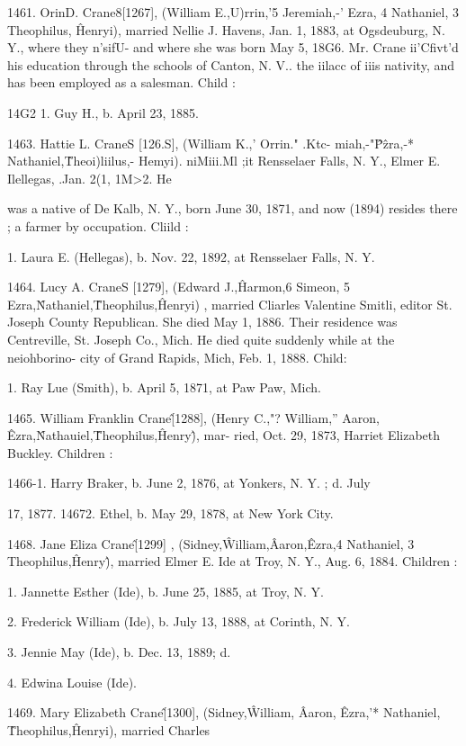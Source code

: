 \documentclass{book}
\begin{document}
1461. OrinD. Crane8[1267], (William E.,U)rrin,'5 Jeremiah,-' 
Ezra, 4 Nathaniel, 3 Theophilus, \^ Henryi), married Nellie J. 
Havens, Jan. 1, 1883, at Ogsdeuburg, N. Y., where they n'sifU- 
and where she was born May 5, 18G6. Mr. Crane ii'Cfivt'd his 
education through the schools of Canton, N. V.. the iilacc of iiis 
nativity, and has been employed as a salesman. Child : 

14G2 1. Guy H., b. April 23, 1885. 

1463. Hattie L. CraneS [126.S], (William K.,' Orrin." .Ktc- 
miah,-"\^ P\^zra,-* Nathaniel,\^ Theoi)liilus,- Hemyi). niMiii.Ml ;it 
Rensselaer Falls, N. Y., Elmer E. Ilellegas, .Jan. 2(1, 1M>2. He 




was a native of De Kalb, N. Y., born June 30, 1871, and now 
(1894) resides there ; a farmer by occupation. Cliild : 

1. Laura E. (Hellegas), b. Nov. 22, 1892, at Rensselaer Falls, N. Y. 

1464. Lucy A. CraneS [1279], (Edward J.,\^ Harmon,6 
Simeon, 5 Ezra,\^ Nathaniel,\^ Theophilus,\^ Henryi) , married Cliarles 
Valentine Smitli, editor St. Joseph County Republican. She died 
May 1, 1886. Their residence was Centreville, St. Joseph Co., 
Mich. He died quite suddenly while at the neiohborino- city of 
Grand Rapids, Mich, Feb. 1, 1888. Child: 

1. Ray Lue (Smith), b. April 5, 1871, at Paw Paw, Mich. 

1465. William Franklin Crane\^ [1288], (Henry C.,"? 
William,'' Aaron, \^ Ezra,\^ Nathauiel,\^ Theophilus,\^ Henry\^), mar- 
ried, Oct. 29, 1873, Harriet Elizabeth Buckley. Children : 

1466-1. Harry Braker, b. June 2, 1876, at Yonkers, N. Y. ; d. July 

17, 1877. 
14672. Ethel, b. May 29, 1878, at New York City. 

1468. Jane Eliza Crane\^ [1299] , (Sidney,\^ William,\^ Aaron,\^ 
Ezra,4 Nathaniel, 3 Theophilus,\^ Henry\^), married Elmer E. Ide 
at Troy, N. Y., Aug. 6, 1884. Children : 

1. Jannette Esther (Ide), b. June 25, 1885, at Troy, N. Y. 

2. Frederick William (Ide), b. July 13, 1888, at Corinth, N. Y. 

3. Jennie May (Ide), b. Dec. 13, 1889; d. 

4. Edwina Louise (Ide). 

1469. Mary Elizabeth Crane\^ [1300], (Sidney,\^ William, \^ 
Aaron, \^ Ezra,'* Nathaniel, \^ Theophilus,\^ Henryi), married Charles 
\end{document}
